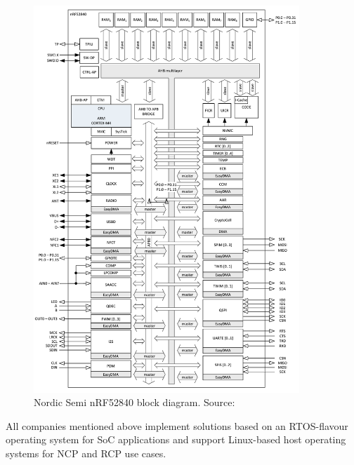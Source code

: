 \begin{figure}
    \centering
    \includegraphics[width=100mm, keepaspectratio]{figures/nordic_nRF52840-block_dia.png}
    \caption{Nordic Semi nRF52840 block diagram. Source: \cite{nordic_semi}}
    \label{fig:mp:nordic-dia}
\end{figure}

All companies mentioned above implement solutions based on an RTOS-flavour operating system for SoC applications and support Linux-based host operating systems for NCP and RCP use cases.